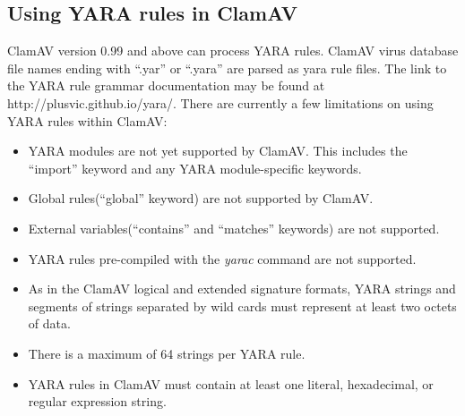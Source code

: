 \documentclass[a4paper,titlepage,12pt]{article}
\begin{document}
    \subsection{Using YARA rules in ClamAV}
    ClamAV version 0.99 and above can process YARA rules. ClamAV virus database file names ending
    with ``.yar'' or ``.yara'' are parsed as yara rule files. The link to the YARA rule grammar
    documentation may be found at http://plusvic.github.io/yara/. There are currently a few 
    limitations on using YARA rules within ClamAV:
    \begin{itemize}
        \item YARA modules are not yet supported by ClamAV. This includes the ``import''
        keyword and any YARA module-specific keywords.
        \item Global rules(``global'' keyword) are not supported by ClamAV.
        \item External variables(``contains'' and ``matches'' keywords) are not supported.
        \item YARA rules pre-compiled with the \emph{yarac} command are not supported.
        \item As in the ClamAV logical and extended signature formats, YARA strings and segments
        of strings separated by wild cards must represent at least two octets of data.
        \item There is a maximum of 64 strings per YARA rule.
        \item YARA rules in ClamAV must contain at least one literal, hexadecimal, or
        regular expression string.
    \end{itemize}
\end{document}
